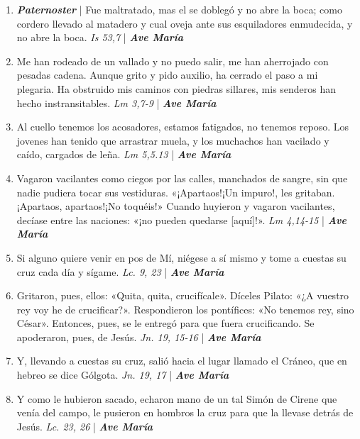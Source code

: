 \documentclass[../../devocionario.tex]{subfiles}
\begin{document}
    \begin{enumerate}
    
        \item \textbf{\textit{Paternoster}} | Fue maltratado, mas el se doblegó y no abre la boca; como cordero llevado al matadero 
            y cual oveja ante sus esquiladores enmudecida, y no abre la boca. \textit{Is 53,7} | \textbf{\textit{Ave María}}

        \item Me han rodeado de un vallado y no puedo salir, me han aherrojado con pesadas cadena. Aunque grito y pido auxilio, 
            ha cerrado el paso a mi plegaria. Ha obstruido mis caminos con piedras sillares, 
            mis senderos han hecho instransitables. \textit{Lm 3,7-9} | \textbf{\textit{Ave María}}

        \item Al cuello tenemos los acosadores, estamos fatigados, no tenemos reposo. Los jovenes han tenido que arrastrar muela, 
            y los muchachos han vacilado y caído, cargados de leña. \textit{Lm 5,5.13} | \textbf{\textit{Ave María}}

        \item Vagaron vacilantes como ciegos por las calles, manchados de sangre, sin que nadie pudiera tocar sus vestiduras. 
            «¡Apartaos!¡Un impuro!, les gritaban. ¡Apartaos, apartaos!¡No toquéis!» 
            Cuando huyieron y vagaron vacilantes, decíase entre las naciones: «¡no pueden quedarse [aquí]!». \textit{Lm 4,14-15} | \textbf{\textit{Ave María}}

        \item Si alguno quiere venir en pos de Mí, niégese a sí mismo y tome a cuestas su cruz cada día y sígame. \textit{Lc. 9, 23} | \textbf{\textit{Ave María}}

        \item Gritaron, pues, ellos: «Quita, quita, crucifícale». Díceles Pilato: «¿A vuestro rey voy he de crucificar?». 
            Respondieron los pontífices: «No tenemos rey, sino César». Entonces, pues, se le entregó para que fuera crucificando. 
            Se apoderaron, pues, de Jesús. \textit{Jn. 19, 15-16} | \textbf{\textit{Ave María}}

        \item Y, llevando a cuestas su cruz, salió hacia el lugar llamado el Cráneo, que en hebreo se dice Gólgota. \textit{Jn. 19, 17} | \textbf{\textit{Ave María}}

        \item Y como le hubieron sacado, echaron mano de un tal Simón de Cirene que venía del campo, 
            le pusieron en hombros la cruz para que la llevase detrás de Jesús. \textit{Lc. 23, 26} | \textbf{\textit{Ave María}}


\end{enumerate}
\end{document}
